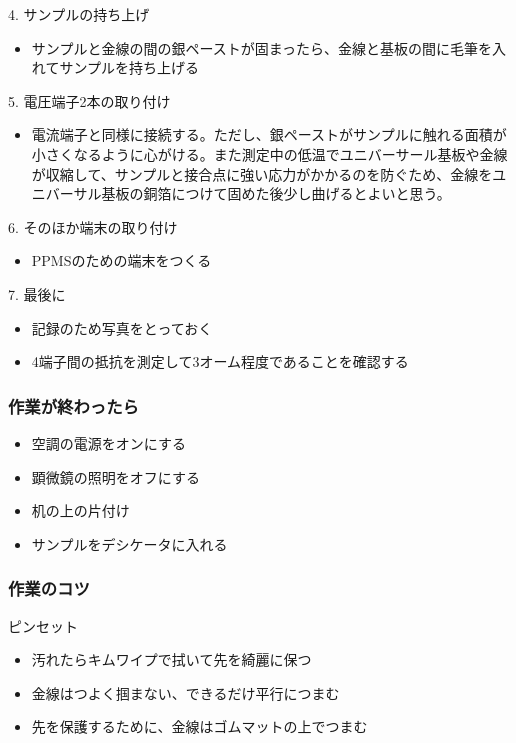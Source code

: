 4. サンプルの持ち上げ
\begin{itemize}
\item サンプルと金線の間の銀ペーストが固まったら、金線と基板の間に毛筆を入れてサンプルを持ち上げる
 \end{itemize}
 
5. 電圧端子2本の取り付け
\begin{itemize}
\item 電流端子と同様に接続する。ただし、銀ペーストがサンプルに触れる面積が小さくなるように心がける。また測定中の低温でユニバーサール基板や金線が収縮して、サンプルと接合点に強い応力がかかるのを防ぐため、金線をユニバーサル基板の銅箔につけて固めた後少し曲げるとよいと思う。
 \end{itemize}
 
6. そのほか端末の取り付け
\begin{itemize}
\item PPMSのための端末をつくる
\end{itemize}

7. 最後に
\begin{itemize}
\item 記録のため写真をとっておく
\item 4端子間の抵抗を測定して3オーム程度であることを確認する
\end{itemize}
 

\subsubsection{作業が終わったら} 
\begin{itemize}
\item 空調の電源をオンにする
\item 顕微鏡の照明をオフにする
\item 机の上の片付け
\item サンプルをデシケータに入れる
\end{itemize}
 
\subsubsection{作業のコツ} 
ピンセット
\begin{itemize}
\item 汚れたらキムワイプで拭いて先を綺麗に保つ
\item 金線はつよく掴まない、できるだけ平行につまむ
\item 先を保護するために、金線はゴムマットの上でつまむ
\end{itemize}
 
